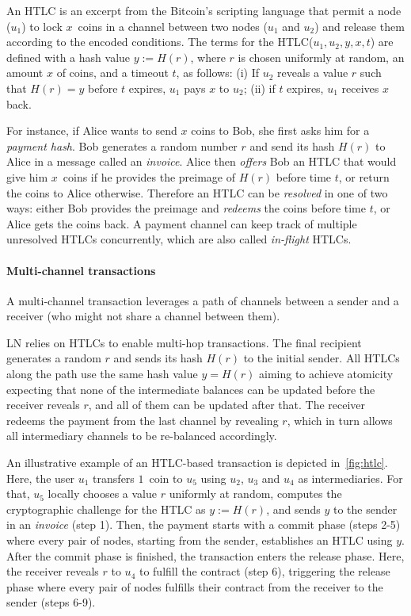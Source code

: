 An HTLC is an excerpt from the Bitcoin's scripting language that 
permit a node ($u_1$) to lock $x$~coins in a channel between two nodes ($u_1$ and $u_2$) 
and release them according to the encoded conditions.
The terms for the HTLC($u_1, u_2, y, x, t$) are defined with a hash value $y := H(r)$, 
where $r$ is chosen uniformly at random, 
an amount $x$ of coins, and a timeout $t$, as follows: 
(i) If $u_2$ reveals a value $r$ such that $H(r) = y$ before $t$ expires, $u_1$ pays $x$ to $u_2$; 
(ii) if $t$ expires, $u_1$ receives $x$ back.

For instance, if Alice wants to send $x$ coins to Bob, she first asks him for a \textit{payment hash}.
Bob generates a random number $r$ and send its hash $H(r)$ to Alice in a message called an \textit{invoice}.
Alice then \textit{offers} Bob an HTLC that would give him $x$~coins if he provides the preimage of $H(r)$ before time $t$, or return the coins to Alice otherwise.
Therefore an HTLC can be \textit{resolved} in one of two ways: either Bob provides the preimage and \textit{redeems} the coins before time $t$, or Alice gets the coins back.
A payment channel can keep track of multiple unresolved HTLCs concurrently, which are also called \textit{in-flight} HTLCs.


\paragraph{Multi-channel transactions}

A multi-channel transaction leverages a path of channels between a sender and a receiver (who might not share a channel between them).

LN relies on HTLCs to enable multi-hop transactions. 
The final recipient generates a random $r$ and sends its hash $H(r)$ to the initial sender.
All HTLCs along the path use the same hash value $y=H(r)$ aiming to achieve atomicity expecting that none of the intermediate balances can be updated before the receiver reveals $r$, and all of them can be updated after that.
The receiver redeems the payment from the last channel by revealing $r$, which in turn allows all intermediary channels to be re-balanced accordingly.

An illustrative example of an HTLC-based transaction is depicted in~\cref{fig:htlc}.
Here, the user $u_1$ transfers $1$~coin to $u_5$ using $u_2$, $u_3$ and $u_4$ as intermediaries.
For that, $u_5$ locally chooses a value $r$ uniformly at random, computes the cryptographic challenge for the HTLC as $y := H(r)$, and sends $y$ to the sender in an \textit{invoice} (step 1).
Then, the payment starts with a commit phase (steps 2-5) where every pair of nodes, starting from the sender, establishes an HTLC using $y$.
After the commit phase is finished, the transaction enters the release phase.
Here, the receiver reveals $r$ to $u_4$ to fulfill the contract (step 6), triggering the release phase where every pair of nodes fulfills their contract from the receiver to the sender (steps 6-9).

